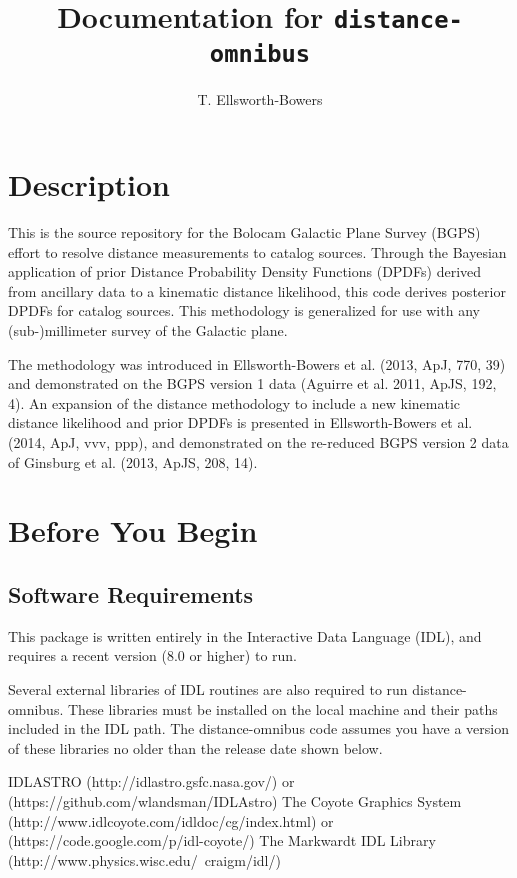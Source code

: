 \documentclass[11pt]{amsart}
\title{Documentation for \texttt{distance-omnibus}}
\author{T. Ellsworth-Bowers}
\date{}                                           %
\begin{document}
\maketitle

\section{Description}

This is the source repository for the Bolocam Galactic Plane Survey (BGPS) effort to resolve distance measurements to catalog sources. Through the Bayesian application of prior Distance Probability Density Functions (DPDFs) derived from ancillary data to a kinematic distance likelihood, this code derives posterior DPDFs for catalog sources. This methodology is generalized for use with any (sub-)millimeter survey of the Galactic plane.

The methodology was introduced in Ellsworth-Bowers et al. (2013, ApJ, 770, 39) and demonstrated on the BGPS version 1 data (Aguirre et al. 2011, ApJS, 192, 4). An expansion of the distance methodology to include a new kinematic distance likelihood and prior DPDFs is presented in Ellsworth-Bowers et al. (2014, ApJ, vvv, ppp), and demonstrated on the re-reduced BGPS version 2 data of Ginsburg et al. (2013, ApJS, 208, 14).

\section{Before You Begin}
\subsection{Software Requirements}

This package is written entirely in the Interactive Data Language (IDL), and requires a recent version (8.0 or higher) to run.

Several external libraries of IDL routines are also required to run distance-omnibus. These libraries must be installed on the local machine and their paths included in the IDL path. The distance-omnibus code assumes you have a version of these libraries no older than the release date shown below.

    IDLASTRO (http://idlastro.gsfc.nasa.gov/) or (https://github.com/wlandsman/IDLAstro)
    The Coyote Graphics System (http://www.idlcoyote.com/idldoc/cg/index.html) or (https://code.google.com/p/idl-coyote/)
    The Markwardt IDL Library (http://www.physics.wisc.edu/~craigm/idl/)
\end{document}
